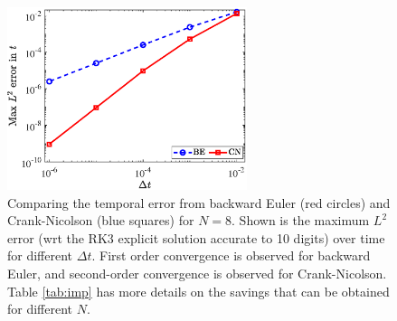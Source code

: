 \begin{figure}
\centering 
\includegraphics[width=70mm]{FECN.eps}
\caption{Comparing the temporal error from backward Euler (red circles) and Crank-Nicolson (blue squares) for $N=8$. Shown is the maximum $L^2$ error (wrt the RK3 explicit solution accurate to 10 digits) over time for different $\Delta t$. First order convergence is observed for backward Euler, and second-order convergence is observed for Crank-Nicolson. Table \ref{tab:imp} has more details on the savings that can be obtained for different $N$.  } 
\label{fig:FECN}
\end{figure}